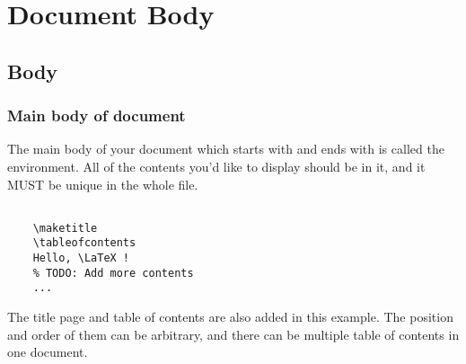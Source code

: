 
\section{Document Body}

\begin{frame}
\end{frame}

\subsection{Body}
\begin{frame}[fragile]
	\frametitle{Main body of document}
	The main body of your document which starts with \texttt{} and ends with \texttt{} is called the  environment. All of the contents you'd like to display should be in it, and it \alert{MUST} be \alert{unique} in the whole file.
	\begin{example}
		\begin{verbatim}

    \maketitle
    \tableofcontents
    Hello, \LaTeX !
    % TODO: Add more contents
    ...

		\end{verbatim}
	\end{example}
	The title page and table of contents are also added in this example. The position and order of them can be arbitrary, and there can be multiple table of contents in one document.
\end{frame}


